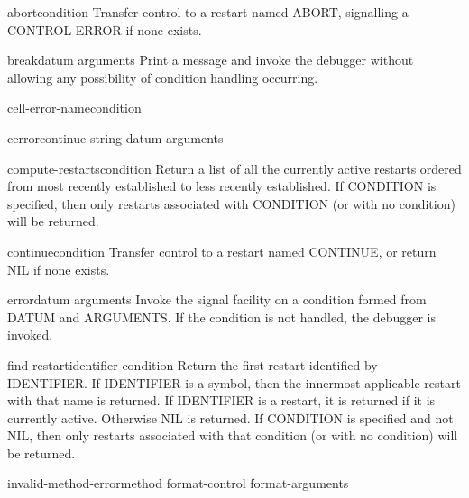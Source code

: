 \documentclass[10pt,english]{book}
\begin{document}
\begin{function}{abort}{\op condition}
  Transfer control to a restart named ABORT, signalling a CONTROL-ERROR if
   none exists.
\end{function}

\begin{function}{break}{\op datum \rest arguments}
  Print a message and invoke the debugger without allowing any possibility
   of condition handling occurring.
\end{function}

\begin{function}{cell-error-name}{condition}
  
\end{function}

\begin{function}{cerror}{continue-string datum \rest arguments}
  
\end{function}

\begin{function}{compute-restarts}{\op condition}
  Return a list of all the currently active restarts ordered from most recently
established to less recently established. If CONDITION is specified, then only
restarts associated with CONDITION (or with no condition) will be returned.
\end{function}

\begin{function}{continue}{\op condition}
  Transfer control to a restart named CONTINUE, or return NIL if none exists.
\end{function}

\begin{function}{error}{datum \rest arguments}
  Invoke the signal facility on a condition formed from DATUM and ARGUMENTS.
  If the condition is not handled, the debugger is invoked.
\end{function}

\begin{function}{find-restart}{identifier \op condition}
  Return the first restart identified by IDENTIFIER. If IDENTIFIER is a symbol,
then the innermost applicable restart with that name is returned. If IDENTIFIER
is a restart, it is returned if it is currently active. Otherwise NIL is
returned. If CONDITION is specified and not NIL, then only restarts associated
with that condition (or with no condition) will be returned.
\end{function}

\begin{function}{invalid-method-error}{method format-control \rest format-arguments}
  
\end{function}
\end{document}
